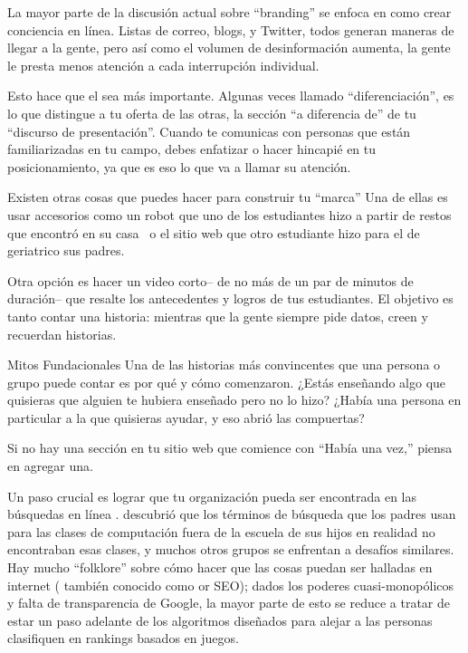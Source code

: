 La mayor parte de la discusión actual sobre ``branding'' se enfoca 
en como crear conciencia en línea.
Listas de correo,
blogs,
y Twitter, todos generan maneras de llegar a la gente,
pero así como el volumen de desinformación aumenta,
la gente le presta menos atención a cada interrupción individual.

Esto hace que el  sea más importante.
Algunas veces llamado ``diferenciación'',
es lo que distingue a tu oferta de las otras, la sección ``a diferencia de'' de tu ``discurso de presentación''.
Cuando te comunicas con personas que están familiarizadas en tu campo,
debes enfatizar o hacer hincapié en tu posicionamiento,
ya que es eso lo que va a llamar su atención.


Existen otras cosas que puedes hacer para construir tu ``marca''
Una de ellas es usar accesorios como un robot que uno de los estudiantes hizo a partir de restos que encontró en su casa~\cite{Schw2013}
o el sitio web que otro estudiante hizo para el de geriatrico sus padres.

Otra opción es hacer un video corto-- de no más de un par de minutos de duración--
que resalte los antecedentes y logros de tus estudiantes.
El objetivo es tanto contar una historia:
mientras que la gente siempre pide datos,
creen y recuerdan historias.


\begin{aside}{Mitos Fundacionales}
 Una de las historias más convincentes que una persona o grupo puede contar es
por qué y cómo comenzaron.
¿Estás enseñando algo que quisieras que alguien te hubiera enseñado pero no lo hizo?
¿Había una persona en particular a la que quisieras ayudar,
y eso abrió las compuertas?

Si no hay una sección en tu sitio web que comience con ``Había una vez,''
piensa en agregar una.

\end{aside}

Un paso crucial es lograr que tu organización pueda ser encontrada en las búsquedas en línea .
\cite{DiSa2014b} descubrió que
los términos de búsqueda que los padres usan para las clases de computación fuera de la escuela de sus hijos
en realidad no encontraban esas clases,
y muchos otros grupos se enfrentan a desafíos similares.
Hay mucho ``folklore'' sobre cómo hacer que las cosas puedan ser halladas en internet 
( también conocido como or SEO);
dados los  poderes cuasi-monopólicos y falta de transparencia de Google,
la mayor parte de esto se reduce a tratar de estar un paso adelante de los 
algoritmos diseñados para alejar a las personas clasifiquen en rankings basados en juegos.

